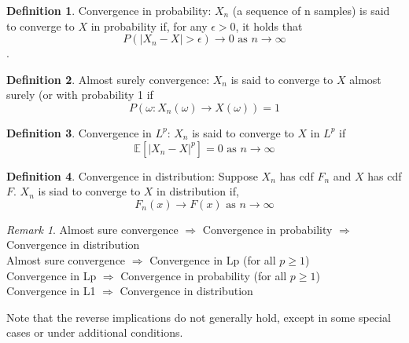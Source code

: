 \documentclass[11pt]{article}
\theoremstyle{definition}
\newtheorem{definition}{Definition}[section]
\theoremstyle{remark}
\newtheorem*{remark}{Remark}
\begin{document}
    \begin{definition}{Convergence in probability: } $X_n$ (a sequence of n samples) is said to converge to $X$ in probability if, for any $\epsilon > 0$, it holds that $$P(|X_n - X| > \epsilon) \rightarrow 0  \text{ as } n \rightarrow \infty$$.
    \end{definition}
    
    \begin{definition}{Almost surely convergence: } $X_n$ is said to converge to $X$ almost surely (or with probability 1 if $$P(\omega: X_n(\omega) \rightarrow X(\omega)) = 1$$
    \end{definition}

    \begin{definition}{Convergence in $L^p$: } $X_n$ is said to converge to $X$ in $L^p$ if $$\mathbb{E}[|X_n - X|^p] = 0 \text{ as } n \rightarrow \infty$$
    \end{definition}
    
    \begin{definition}{Convergence in distribution: } Suppose $X_n$ has cdf $F_n$ and $X$ has cdf $F$. $X_n$ is siad to converge to $X$ in distribution if, $$F_n(x) \rightarrow F(x) \text{ as } n \rightarrow \infty$$ \color{red}{on every point $x$ at which $F(x)$ is continuous.}
    \end{definition}
    
    \begin{remark}
        Almost sure convergence $\Rightarrow$ Convergence in probability $\Rightarrow$ Convergence in distribution\\
        Almost sure convergence $\Rightarrow$ Convergence in Lp (for all $p \geq 1$) \\
        Convergence in Lp $\Rightarrow$ Convergence in probability (for all $p \geq 1$) \\
        Convergence in L1 $\Rightarrow$ Convergence in distribution

        Note that the reverse implications do not generally hold, except in some special cases or under additional conditions.
    \end{remark}
\end{document}
